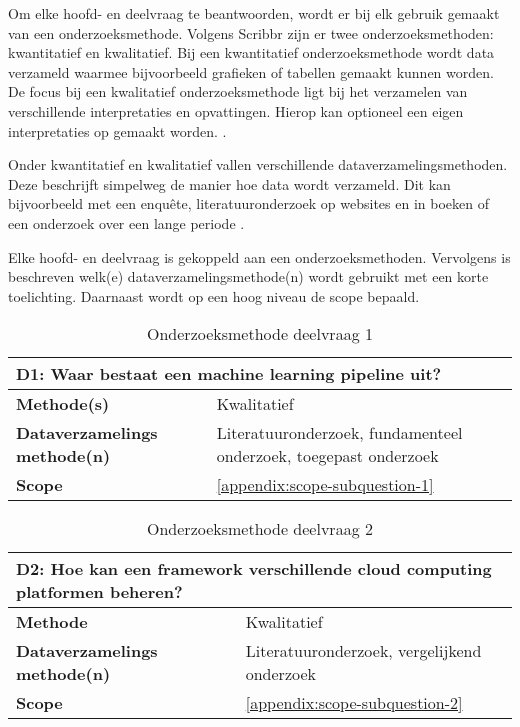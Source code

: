 
\renewcommand{\arraystretch}{1.35} %

Om elke hoofd- en deelvraag te beantwoorden, wordt er bij elk gebruik gemaakt van een onderzoeksmethode. Volgens Scribbr \cite{research-methods} zijn er twee onderzoeksmethoden: kwantitatief en kwalitatief. Bij een kwantitatief onderzoeksmethode wordt data verzameld waarmee bijvoorbeeld grafieken of tabellen gemaakt kunnen worden. De focus bij een kwalitatief onderzoeksmethode ligt bij het verzamelen van verschillende interpretaties en opvattingen. Hierop kan optioneel een eigen interpretaties op gemaakt worden. \cite{quantitative-vs-qualitative}.

Onder kwantitatief en kwalitatief vallen verschillende dataverzamelingsmethoden. Deze beschrijft simpelweg de manier hoe data wordt verzameld. Dit kan bijvoorbeeld met een enquête, literatuuronderzoek op websites en in boeken of een onderzoek over een lange periode \cite{quantitative-vs-qualitative}.

Elke hoofd- en deelvraag is gekoppeld aan een onderzoeksmethoden. Vervolgens is beschreven welk(e) dataverzamelingsmethode(n) wordt gebruikt met een korte toelichting. Daarnaast wordt op een hoog niveau de scope bepaald.

\begin{table}[hbt!]
  \centering
  \begin{tabular}{|p{.215\linewidth}|p{.72\linewidth}|}
  \hline
  \multicolumn{2}{|p{.97\linewidth}|}{\textbf{D1: Waar bestaat een machine learning pipeline uit?}} \\ \hline
    \textbf{Methode(s)}&
      Kwalitatief
    \\ \hline
    \textbf{Dataverzamelings methode(n)}&
      Literatuuronderzoek, fundamenteel onderzoek, toegepast onderzoek
    \\ \hline
    \textbf{Scope}&
      \autoref{appendix:scope-subquestion-1}
    \\ \hline
  \end{tabular}
  \caption{Onderzoeksmethode deelvraag 1}
  \label{table:research-method-subquestion-1}
\end{table}

\begin{table}[hbt!]
  \centering
  \begin{tabular}{|p{.215\linewidth}|p{.72\linewidth}|}
  \hline
  \multicolumn{2}{|p{.97\linewidth}|}{\textbf{D2: Hoe kan een framework verschillende cloud computing platformen beheren?}} \\ \hline
    \textbf{Methode}&
      Kwalitatief
    \\ \hline
    \textbf{Dataverzamelings methode(n)}&
      Literatuuronderzoek, vergelijkend onderzoek
    \\ \hline
    \textbf{Scope}&
      \autoref{appendix:scope-subquestion-2}
    \\ \hline
  \end{tabular}
  \caption{Onderzoeksmethode deelvraag 2}
  \label{table:sq2}
\end{table}

